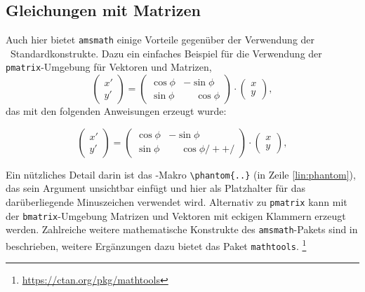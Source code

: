 \subsection{Gleichungen mit Matrizen}

Auch hier bietet \texttt{amsmath} einige Vorteile gegenüber der Verwendung
der \latex\ Standardkonstrukte. Dazu ein einfaches Beispiel für die
Verwendung der \texttt{pmatrix}-Umgebung für Vektoren und Matrizen,
%
\begin{equation}
	\begin{pmatrix}
		x' \\ y'
	\end{pmatrix}
	=
	\begin{pmatrix}
		\cos \phi & -\sin \phi           \\
		\sin \phi & \phantom{-}\cos \phi
	\end{pmatrix}
	\cdot
	\begin{pmatrix}
		x \\ y
	\end{pmatrix} ,
\end{equation}
%
das mit den folgenden Anweisungen erzeugt wurde:
%
\begin{LaTeXCode}
\begin{equation}
	\begin{pmatrix} 
			x' \\ 
			y' 
	\end{pmatrix}
	= 
	\begin{pmatrix}
		  \cos \phi &          -\sin \phi \\
		  \sin \phi & \phantom{-}\cos \phi /+ \label{lin:phantom} +/
	\end{pmatrix} 
	\cdot
	\begin{pmatrix} 
			x \\ 
			y 
	\end{pmatrix} ,
\end{equation}
\end{LaTeXCode}
%
Ein nützliches Detail darin ist das \tex-Makro \verb!\phantom{..}! (in Zeile
\ref{lin:phantom}), das sein Argument unsichtbar einfügt und hier als
Platzhalter für das darüberliegende Minuszeichen verwendet wird. Alternativ
zu \texttt{pmatrix} kann mit der \texttt{bmatrix}-Umgebung Matrizen und
Vektoren mit eckigen Klammern erzeugt werden. Zahlreiche weitere
mathematische Konstrukte des \texttt{amsmath}-Pakets sind in
\cite{Mittelbach2025} beschrieben, weitere Ergänzungen dazu bietet das Paket
\texttt{mathtools}.%
\footnote{\url{https://ctan.org/pkg/mathtools}}



